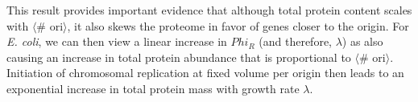 
%
%
%
%
%

This result provides important evidence that although total protein content
scales with $\langle$\# ori$\rangle$, it also skews the proteome in favor of
genes closer to the origin.  For \textit{E. coli}, we can then view a linear
increase in $Phi_R$ (and therefore, $\lambda$) as also causing an increase in
total protein abundance that is proportional to $\langle$\# ori$\rangle$.
Initiation of chromosomal replication at fixed volume per origin then leads to
an exponential increase in total protein mass with growth rate $\lambda$.

